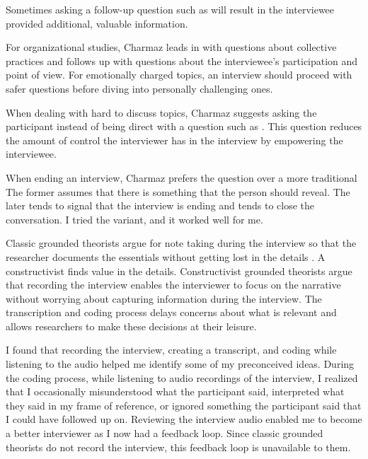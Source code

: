 Sometimes asking a follow-up question such as  will result in the interviewee provided additional, valuable information.

For organizational studies, Charmaz leads in with questions about collective practices and follows up with questions about the interviewee's participation and point of view. For emotionally charged topics, an interview should proceed with safer questions before diving into personally challenging ones. 

When dealing with hard to discuss topics, Charmaz suggests asking the participant  instead of being direct with a question such as  \cite{Charmaz}. This question reduces the amount of control the interviewer has in the interview by empowering the interviewee.

When ending an interview, Charmaz prefers the question  over a more traditional  The former assumes that there is something that the person should reveal. The later tends to signal that the interview is ending and tends to close the conversation. I tried the variant,  and it worked well for me.


Classic grounded theorists argue for note taking during the interview
so that the researcher documents the essentials without getting lost in the details \cite{GlaserTheoreticalSensitivity, GlaserGroundedTheoryPerspective}.  A constructivist finds value in the details. Constructivist grounded theorists argue that recording the interview enables the interviewer to focus on the narrative without worrying about capturing information during the interview. The transcription and coding process delays concerns about what is relevant and allows researchers to make these decisions at their leisure.  

I found that recording the interview, creating a transcript, and coding while listening to the audio helped me identify some of my preconceived ideas. During the coding process, while listening to audio recordings of the interview, I realized that I occasionally misunderstood what the participant said, interpreted what they said in my frame of reference,  or ignored something the participant said that I could have followed up on. Reviewing the interview audio enabled me to become a better interviewer as I now had a feedback loop. Since classic grounded theorists do not record the interview, this feedback loop is unavailable to them.

